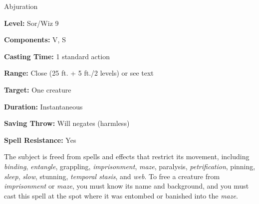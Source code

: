 
Abjuration

\textbf{Level:} Sor/Wiz 9

\textbf{Components:} V, S

\textbf{Casting Time:} 1 standard action

\textbf{Range:} Close (25 ft. + 5 ft./2 levels) or see text

\textbf{Target:} One creature

\textbf{Duration:} Instantaneous

\textbf{Saving Throw:} Will negates (harmless)

\textbf{Spell Resistance:} Yes

The subject is freed from spells and effects that restrict its movement, including 
\textit{binding}, \textit{entangle}, grappling, \textit{imprisonment}, \textit{maze}, 
paralysis, \textit{petrification}, pinning, \textit{sleep}, \textit{slow}, stunning, 
\textit{temporal stasis}, and \textit{web}. To free a creature from \textit{imprisonment 
}or \textit{maze}, you must know its name and background, and you must cast this 
spell at the spot where it was entombed or banished into the \textit{maze}.

